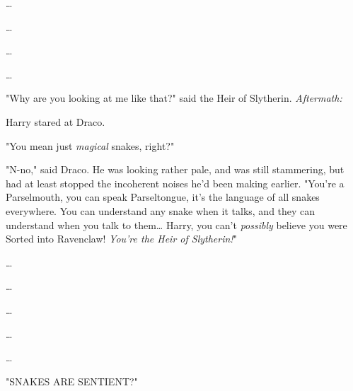 {\ldots}

{\ldots}

{\ldots}

{\ldots}

"Why are you looking at me like that?" said the Heir of Slytherin.
\sbreak
\emph{Aftermath:}

Harry stared at Draco.

"You mean just \emph{magical} snakes, right?"

"N-no," said Draco. He was looking rather pale, and was still stammering, but 
had at least stopped the incoherent noises he'd been making earlier. "You're a 
Parselmouth, you can speak Parseltongue, it's the language of all snakes 
everywhere. You can understand any snake when it talks, and they can understand 
when you talk to them{\ldots} Harry, you can't \emph{possibly} believe you were 
Sorted into Ravenclaw! \emph{You're the Heir of Slytherin!}"

{\ldots}

{\ldots}

{\ldots}

{\ldots}

{\ldots}

"SNAKES ARE SENTIENT?"